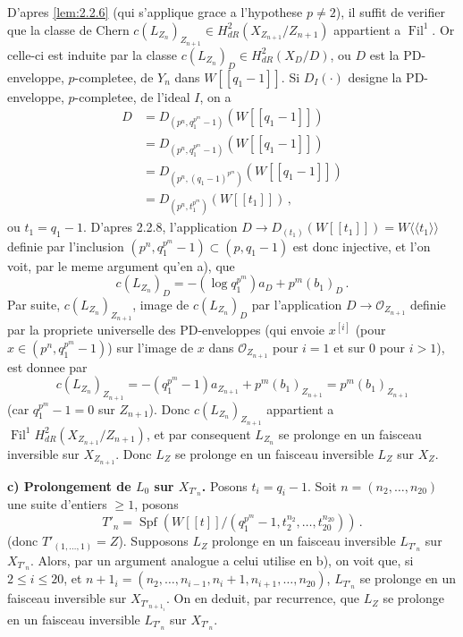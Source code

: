 \documentclass[12pt,a4paper]{article}
\theoremstyle{plain}
\theoremstyle{definition}
\theoremstyle{remark}
\DeclareMathOperator{\Spf}{Spf}
\DeclareMathOperator{\Fil}{Fil}
\begin{document}
D'apres \ref{lem:2.2.6} (qui s'applique grace a l'hypothese $p \neq 2$), il suffit de verifier que la classe de Chern $c(L_{Z_n})_{Z_{n+1}} \in H_{dR}^2(X_{Z_{n+1}}/Z_{n+1})$ appartient a $\Fil^1$. Or celle-ci est induite par la classe $c(L_{Z_n})_D \in H_{dR}^2(X_D/D)$, ou $D$ est la PD-enveloppe, $p$-completee, de $Y_n$ dans $W[[q_1-1]]$. Si $D_I(\cdot)$ designe la PD-enveloppe, $p$-completee, de l'ideal $I$, on a
\[
\begin{aligned}
D &= D_{(p^n, q_1^{p^m}-1)}(W[[q_1-1]]) \\
&= D_{(p^n, q_1^{p^m}-1)}(W[[q_1-1]]) \\
&= D_{(p^n, (q_1-1)^{p^m})}(W[[q_1-1]]) \\
&= D_{(p^n, t_1^{p^m})}(W[[t_1]])\,,
\end{aligned}
\]
ou $t_1 = q_1 - 1$. D'apres 2.2.8, l'application $D \to D_{(t_1)}(W[[t_1]]) = W\langle\langle t_1 \rangle\rangle$ definie par l'inclusion $(p^n, q_1^{p^m} - 1) \subset (p, q_1 - 1)$ est donc injective, et l'on voit, par le meme argument qu'en a), que
\[
c(L_{Z_n})_D = -(\log q_1^{p^m})a_D + p^m(b_1)_D\,.\]
Par suite, $c(L_{Z_n})_{Z_{n+1}}$, image de $c(L_{Z_n})_D$ par l'application $D \to \mathcal{O}_{Z_{n+1}}$ definie par la propriete universelle des PD-enveloppes (qui envoie $x^{[i]}$ (pour $x \in (p^n, q_1^{p^m} - 1)$) sur l'image de $x$ dans $\mathcal{O}_{Z_{n+1}}$ pour $i = 1$ et sur $0$ pour $i > 1$), est donnee par
\[
c(L_{Z_n})_{Z_{n+1}} = -(q_1^{p^m} - 1)a_{Z_{n+1}} + p^m(b_1)_{Z_{n+1}} = p^m(b_1)_{Z_{n+1}}
\]
(car $q_1^{p^m} - 1 = 0$ sur $Z_{n+1}$). Donc $c(L_{Z_n})_{Z_{n+1}}$ appartient a $\Fil^1H_{dR}^2(X_{Z_{n+1}}/Z_{n+1})$, et par consequent $L_{Z_n}$ se prolonge en un faisceau inversible sur $X_{Z_{n+1}}$. Donc $L_Z$ se prolonge en un faisceau inversible $L_Z$ sur $X_Z$.

\textbf{c) Prolongement de $L_0$ sur $X_{T'_n}$.} Posons $t_i = q_i - 1$. Soit $n = (n_2, \ldots, n_{20})$ une suite d'entiers $\geq 1$, posons
\[
T'_n = \Spf(W[[t]]/(q_1^{p^m} - 1, t_2^{n_2}, \ldots, t_{20}^{n_{20}}))\,.
\]
(donc $T'_{(1, \ldots, 1)} = Z$). Supposons $L_Z$ prolonge en un faisceau inversible $L_{T'_n}$ sur $X_{T'_n}$. Alors, par un argument analogue a celui utilise en b), on voit que, si $2 \leq i \leq 20$, et $n+1_i = (n_2, \ldots, n_{i-1}, n_i+1, n_{i+1}, \ldots, n_{20})$, $L_{T'_n}$ se prolonge en un faisceau inversible sur $X_{T'_{n+1_i}}$. On en deduit, par recurrence, que $L_Z$ se prolonge en un faisceau inversible $L_{T'_n}$ sur $X_{T'_n}$.
\end{document}
